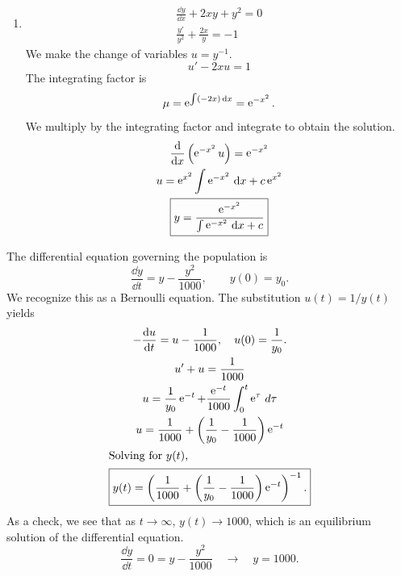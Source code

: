 {\begin{Solution}
\begin{enumerate}
\begin{enumerate}
\begin{gather*}
        u = \frac{2}{5} t^{-1} + c t^4 \\
        y^{-2} = \frac{2}{5} t^{-1} + c t^4 \\
        y = \pm \frac{1}{ \sqrt{ \frac{2}{5} t^{-1} + c t^4 } }
        \boxed{
          y = \pm \frac{\sqrt{5 t}}{ \sqrt{ 2 + c t^5 } }
          }
      \end{gather*}
    \item
      \begin{gather*}
        \frac{\dd y}{\dd x} + 2 x y + y^2 = 0 \\
        \frac{y'}{y^2} + \frac{2 x}{y} = -1
      \end{gather*}
      We make the change of variables $u = y^{-1}$.
      \[
      u' - 2 x u = 1
      \]
      The integrating factor is
      \[
      \mu = \mathop{\mathrm{e}}\nolimits^{\int (-2 x) \,\mathrm{d} x} = \mathop{\mathrm{e}}\nolimits^{-x^2}.
      \]
      We multiply by the integrating factor and integrate to obtain the solution.
      \begin{gather*}
        \frac{\mathrm{d}}{\mathrm{d} x} \left( \mathop{\mathrm{e}}\nolimits^{-x^2} u \right) = \mathop{\mathrm{e}}\nolimits^{-x^2} \\
        u = \mathop{\mathrm{e}}\nolimits^{x^2} \int \mathop{\mathrm{e}}\nolimits^{-x^2} \,\mathrm{d} x + c \mathop{\mathrm{e}}\nolimits^{x^2} \\
        \boxed{
          y = \frac{ \mathop{\mathrm{e}}\nolimits^{-x^2} }{ \int \mathop{\mathrm{e}}\nolimits^{-x^2} \,\mathrm{d} x + c }
          }
      \end{gather*}
    \end{enumerate}
  \end{enumerate}
\end{Solution}







\begin{Solution}
  \label{solution population}
  The differential equation governing the population is
  \[ 
  \frac{\dd y}{\dd t} = y - \frac{y^2}{1000}, \qquad y(0) = y_0.
  \]
  We recognize this as a Bernoulli equation.  The substitution $u(t) = 1/y(t)$
  yields
  \begin{gather*}
    -\frac{\mathrm{d} u}{\mathrm{d} t} = u - \frac{1}{1000}, \quad u(0) = \frac{1}{y_0}.\\
    u' + u = \frac{1}{1000} \\
    u = \frac{1}{y_0} \mathop{\mathrm{e}}\nolimits^{-t} + \frac{\mathop{\mathrm{e}}\nolimits^{-t}}{1000}\int_0^t \mathop{\mathrm{e}}\nolimits^{\tau}\,d\tau\\
    u = \frac{1}{1000} + \left(\frac{1}{y_0} - \frac{1}{1000}\right)\mathop{\mathrm{e}}\nolimits^{-t} \\
    \intertext{Solving for $y(t)$,}
    \boxed{
      y(t) = \left(\frac{1}{1000} + \left(\frac{1}{y_0} 
          - \frac{1}{1000}\right)\mathop{\mathrm{e}}\nolimits^{-t}\right)^{-1}.
      }
  \end{gather*}
  As a check, we see that as $t \to \infty$, $y(t) \to 1000$, which is 
  an equilibrium solution of the differential equation.
  \[ 
  \frac{\dd y}{\dd t} = 0 = y - \frac{y^2}{1000} \quad \to \quad y = 1000.
  \]
\end{Solution}





}
